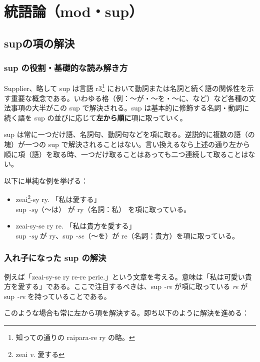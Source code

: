 \chapter{統語論（mod・sup）}

\section{supの項の解決}

\subsection{sup の役割・基礎的な読み解き方}

Supplier、略して sup は言語 r3\footnote{知っての通りの raipara-re ry の略。} において動詞または名詞と続く語の関係性を示す重要な概念である。いわゆる格（例：～が・～を・～に、など）など各種の文法事項の大半がこの sup で解決される。sup は基本的に修飾する名詞・動詞に続く語を sup の並びに応じて\textbf{左から順に}項に取っていく。

sup は常に一つだけ語、名詞句、動詞句などを項に取る。逆説的に複数の語（の塊）が一つの sup で解決されることはない。言い換えるなら上述の通り左から順に項（語）を取る時、一つだけ取ることはあっても二つ連続して取ることはない。

以下に単純な例を挙げる：

\begin{itemize}
    \item zeai\footnote{zeai \emph{v.} 愛する}-sy ry. 「私は愛する」\\ sup \emph{-sy}（～は） が ry（名詞：私） を項に取っている。
    \item zeai-sy-se ry re. 「私は貴方を愛する」\\ sup \emph{-sy} が ry、sup \emph{-se}（～を）が re（名詞：貴方）を項に取っている。
\end{itemize}

\subsection{入れ子になった sup の解決}

例えば「zeai-sy-se ry re-re perie.」という文章を考える。意味は「私は可愛い貴方を愛する」である。ここで注目するべきは、sup \emph{-re} が項に取っている \emph{re} が sup \emph{-re} を持っていることである。

このような場合も常に左から項を解決する。即ち以下のように解決を進める：

